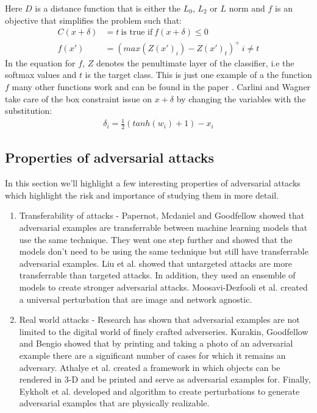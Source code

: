 \documentclass[journal,onecolumn]{IEEEtran}
\begin{document}
\begin{enumerate}
Here $D$ is a distance function that is either the $L_0$, $L_2$ or $L$ norm and $f$ is an objective that simplifies the problem such that:
\begin{align*}
C(x + \delta) &= t \ \text{is true if} \ f(x + \delta) \leq 0\\
f(x') &= (max(Z(x')_i) - Z(x')_t)^+ \ i \neq t
\end{align*}
In the equation for $f$, $Z$ denotes the penultimate layer of the classifier, i.e the softmax values and $t$ is the target class. This is just one example of a the function $f$ many other functions work and can be found in the paper \cite{C&W}. Carlini and Wagner \cite{C&W} take care of the box constraint issue on $x + \delta$ by changing the variables with the substitution:
\begin{align*}
\delta_i = \frac{1}{2}(tanh(w_i) + 1) - x_i
\end{align*}

\end{enumerate}

\subsection{Properties of adversarial attacks}
In this section we'll highlight a few interesting properties of adversarial attacks which highlight the risk and importance of studying them in more detail.
\begin{enumerate}
\item Transferability of attacks - Papernot, Mcdaniel and Goodfellow \cite{PMG} showed that adversarial examples are transferrable between machine learning models that use the same technique. They went one step further and showed that the models don't need to be using the same technique but still have transferrable adversarial examples. Liu et al. \cite{Liu} showed that untargeted attacks are more transferrable than targeted attacks. In addition, they used an ensemble of models to create stronger adversarial attacks. Moosavi-Dezfooli et al. \cite{MD} created a universal perturbation that are image and network agnostic.
\item Real world attacks - Research has shown that adversarial examples are not limited to the digital world of finely crafted adverseries. Kurakin, Goodfellow and Bengio \cite{G} showed that by printing and taking a photo of an adversarial example there are a significant number of cases for which it remains an adversary. Athalye et al. \cite{A} created a framework in which objects can be rendered in 3-D and be printed and serve as adversarial examples for. Finally, Eykholt et al. \cite{E} developed and algorithm to create perturbations to generate adversarial examples that are physically realizable. 
\end{enumerate}
\end{document}
